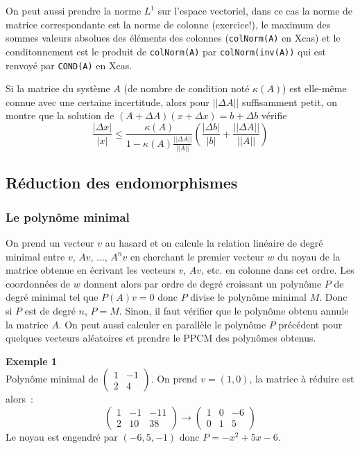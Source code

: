 \documentclass[a4paper,11pt]{article}
\begin{document}
On peut aussi prendre la norme $L^1$ sur l'espace vectoriel, dans ce
cas la norme de matrice correspondante est la norme de colonne (exercice!),
le maximum des sommes valeurs absolues des \'el\'ements
des colonnes (\verb|colNorm(A)| en Xcas) et le conditonnement
est le produit de \verb|colNorm(A)| par \verb|colNorm(inv(A))|
qui est renvoy\'e par \verb|COND(A)| en Xcas.

Si la matrice du syst\`eme $A$ (de nombre de condition not\'e
$\kappa(A)$) est elle-m\^eme connue avec une
certaine incertitude, alors pour $||\Delta A||$ suffisamment petit,
on montre que la solution de
$(A+\Delta A)(x+\Delta x)=b+\Delta b$ v\'erifie
$$ \frac {|\Delta x |}{|x|}\leq
\frac{\kappa(A)}{1-\kappa(A)\frac{||\Delta A||}{||A||}}
\left(\frac{|\Delta b|}{|b|}+\frac{||\Delta A||}{||A||}
\right) $$



\subsection{R\'eduction des endomorphismes}
\subsubsection{Le polyn\^ome minimal}
On prend un vecteur $v$ au hasard et on calcule la relation lin\'eaire
de degr\'e minimal entre $v$, $Av$, ..., $A^nv$ en cherchant
le premier vecteur $w$ du noyau de la matrice obtenue en écrivant
les vecteurs $v$, $Av$, etc. en colonne dans cet ordre. Les
coordonnées de $w$ donnent alors par ordre de degré croissant
un polynôme $P$ de degr\'e minimal tel que $P(A)v=0$ donc
$P$ divise le polynôme minimal $M$. Donc si $P$ est de
degré $n$, $P=M$. Sinon, il faut v\'erifier que le polynôme obtenu 
annule la matrice $A$. On peut aussi calculer en parallèle le polynôme $P$
précédent pour quelques vecteurs aléatoires et prendre le PPCM des
polynômes obtenus.

{\bf Exemple 1}\\
Polynôme minimal de $\left(\begin{array}{cc} 1 & -1 \\ 2 & 4
\end{array}\right) $. On prend $v=(1,0)$, la matrice à réduire est
alors~:
\[ \left(\begin{array}{ccc} 1 & -1 & -11 \\ 2 & 10 & 38
\end{array}\right) \rightarrow 
\left(\begin{array}{ccc} 1 & 0 & -6 \\ 0 & 1 & 5
\end{array}\right)
\]
Le noyau est engendré par $(-6,5,-1)$ donc $P=-x^2+5x-6$.
\end{document}
